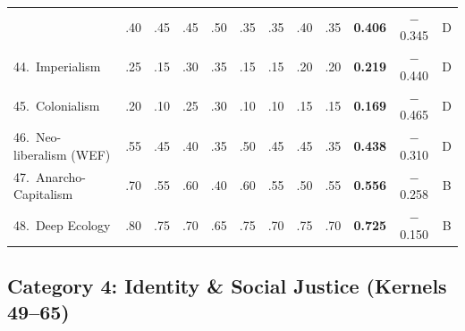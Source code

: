 \documentclass[11pt,a4paper]{article}
\theoremstyle{definition}
\theoremstyle{remark}
\begin{document}
\begin{longtable}{@{}l|cccccccc|cc|c@{}}
  & .40 & .45 & .45 & .50 & .35 & .35 & .40 & .35
  & \textbf{0.406} & $-$0.345 & \textcolor{collapse}{D} \\
44.\ Imperialism
  & .25 & .15 & .30 & .35 & .15 & .15 & .20 & .20
  & \textbf{0.219} & $-$0.440 & \textcolor{collapse}{D} \\
45.\ Colonialism
  & .20 & .10 & .25 & .30 & .10 & .10 & .15 & .15
  & \textbf{0.169} & $-$0.465 & \textcolor{collapse}{D} \\
46.\ Neo-liberalism (WEF)
  & .55 & .45 & .40 & .35 & .50 & .45 & .45 & .35
  & \textbf{0.438} & $-$0.310 & \textcolor{collapse}{D} \\
47.\ Anarcho-Capitalism
  & .70 & .55 & .60 & .40 & .60 & .55 & .50 & .55
  & \textbf{0.556} & $-$0.258 & \textcolor{borderline}{B} \\
48.\ Deep Ecology
  & .80 & .75 & .70 & .65 & .75 & .70 & .75 & .70
  & \textbf{0.725} & $-$0.150 & \textcolor{borderline}{B} \\

\end{longtable}

\subsection{Category 4: Identity \& Social Justice
  (Kernels 49--65)}
\label{sec:cat4}
\end{document}
